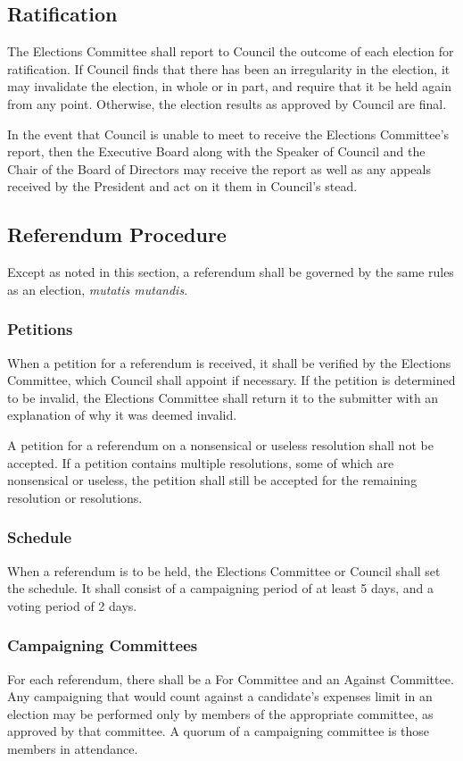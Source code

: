\subsection{Ratification}
The Elections Committee shall report to Council the outcome of each election for ratification.
If Council finds that there has been an irregularity in the election, it may invalidate the election, in whole or in part, and require that it be held again from any point.
Otherwise, the election results as approved by Council are final.

In the event that Council is unable to meet to receive the Elections Committee's report, then the Executive Board along with the Speaker of Council and the Chair of the Board of Directors  may receive the report as well as any appeals received by the President and act on it them in Council's stead.

\subsection{Referendum Procedure}
Except as noted in this section, a referendum shall be governed by the same rules as an election, \emph{mutatis mutandis}.

\subsubsection{Petitions}
When a petition for a referendum is received, it shall be verified by the Elections Committee, which Council shall appoint if necessary.
If the petition is determined to be invalid, the Elections Committee shall return it to the submitter with an explanation of why it was deemed invalid.

A petition for a referendum on a nonsensical or useless resolution shall not be accepted.
If a petition contains multiple resolutions, some of which are nonsensical or useless, the petition shall still be accepted for the remaining
resolution or resolutions.

\subsubsection{Schedule}
When a referendum is to be held, the Elections Committee or Council shall set the schedule.
It shall consist of a campaigning period of at least 5 days, and a voting period of 2 days.

\subsubsection{Campaigning Committees}
For each referendum, there shall be a For Committee and an Against Committee.
Any campaigning that would count against a candidate's expenses limit in an election may be performed only by members of the appropriate committee, as approved by that committee.
A quorum of a campaigning committee is those members in attendance.

